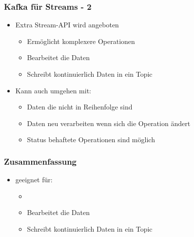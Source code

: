 \begin{frame}
\frametitle{Kafka für Streams - 2}

\begin{itemize}
	\item Extra Stream-API wird angeboten
	\begin{itemize}
		\item Ermöglicht komplexere Operationen  %
		\item Bearbeitet die Daten %
		\item Schreibt kontinuierlich Daten in ein Topic %
	\end{itemize}
	\item Kann auch umgehen mit:
	\begin{itemize}
		\item Daten die nicht in Reihenfolge sind  %
		\item Daten neu verarbeiten wenn sich die Operation ändert %
		\item Status behaftete Operationen sind möglich %
	\end{itemize}
\end{itemize}


\end{frame}

\begin{frame}
\frametitle{Zusammenfassung}

\begin{itemize}
	\item geeignet für:
	\begin{itemize}
		\item   %
		\item Bearbeitet die Daten %
		\item Schreibt kontinuierlich Daten in ein Topic %
	\end{itemize}
\end{itemize}

\end{frame}


